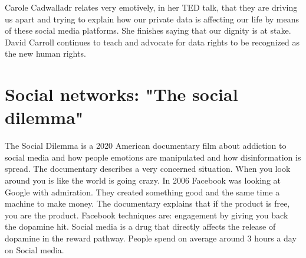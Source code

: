  
   
 
 Carole Cadwalladr relates very emotively, in her TED talk, that they are driving us apart
 and trying to explain how our private data  is affecting our life by means of these social media platforms. 
 She finishes saying that our dignity is at stake. 
 David Carroll continues to teach and advocate for data rights to be recognized as the new human rights. 
 
   
   
   
   
   
   
   
   
   
   
   
   
   
   
   
   
   
   
   
  
\newpage         
\section*{Social networks: "The social dilemma"}
The Social Dilemma is a 2020 American documentary film about 
addiction to social media and how people emotions are manipulated  
and how disinformation is spread.
The documentary describes a very concerned situation. 
When you look around you is like the world is going crazy. 
In 2006 Facebook was looking at Google with admiration. 
They created something good and the same time a machine to make money.  
The documentary explains that if the  product is free, you are the product.  
Facebook techniques are: engagement by  giving you back the dopamine hit. 
Social media is a drug that directly affects the release of dopamine in the reward pathway. 
People spend on average around 3 hours a day on Social media. 
  
